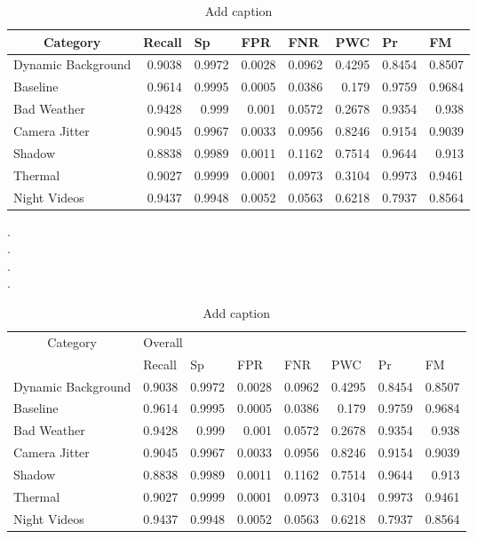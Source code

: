 \documentclass{article}
\begin{document}
\begin{table}[htbp]
  \centering
  \caption{Add caption}
    \begin{tabular}{lrrrrrrr}  \hline
    \multicolumn{1}{c}{Category} & \multicolumn{1}{l}{Recall} & \multicolumn{1}{l}{Sp} & \multicolumn{1}{l}{FPR} & \multicolumn{1}{l}{FNR} & \multicolumn{1}{l}{PWC} & \multicolumn{1}{l}{Pr} & \multicolumn{1}{l}{FM} \\
    \hline
    Dynamic Background & 0.9038 & 0.9972 & 0.0028 & 0.0962 & 0.4295 & 0.8454 & 0.8507 \\
    Baseline & 0.9614 & 0.9995 & 0.0005 & 0.0386 & 0.179 & 0.9759 & 0.9684 \\
    Bad Weather & 0.9428 & 0.999 & 0.001 & 0.0572 & 0.2678 & 0.9354 & 0.938 \\
    Camera Jitter & 0.9045 & 0.9967 & 0.0033 & 0.0956 & 0.8246 & 0.9154 & 0.9039 \\
    Shadow & 0.8838 & 0.9989 & 0.0011 & 0.1162 & 0.7514 & 0.9644 & 0.913 \\
    Thermal & 0.9027 & 0.9999 & 0.0001 & 0.0973 & 0.3104 & 0.9973 & 0.9461 \\
    Night Videos & 0.9437 & 0.9948 & 0.0052 & 0.0563 & 0.6218 & 0.7937 & 0.8564 \\
    \hline  
  \end{tabular}%
  \label{tab:cGan}%
\end{table}%


 .\\
 .\\
. \\
. \\
 

\begin{table}[htbp]
  \centering
  \caption{Add caption}
    \begin{tabular}{lrrrrrrr}
    \toprule
    \multicolumn{1}{c}{Category} & \multicolumn{7}{l}{Overall} \\
\cmidrule{2-8}          & \multicolumn{1}{l}{Recall} & \multicolumn{1}{l}{Sp} & \multicolumn{1}{l}{FPR} & \multicolumn{1}{l}{FNR} & \multicolumn{1}{l}{PWC} & \multicolumn{1}{l}{Pr} & \multicolumn{1}{l}{FM} \\
    \midrule
    Dynamic Background & 0.9038 & 0.9972 & 0.0028 & 0.0962 & 0.4295 & 0.8454 & 0.8507 \\
    Baseline & 0.9614 & 0.9995 & 0.0005 & 0.0386 & 0.179 & 0.9759 & 0.9684 \\
    Bad Weather & 0.9428 & 0.999 & 0.001 & 0.0572 & 0.2678 & 0.9354 & 0.938 \\
    Camera Jitter & 0.9045 & 0.9967 & 0.0033 & 0.0956 & 0.8246 & 0.9154 & 0.9039 \\
    Shadow & 0.8838 & 0.9989 & 0.0011 & 0.1162 & 0.7514 & 0.9644 & 0.913 \\
    Thermal & 0.9027 & 0.9999 & 0.0001 & 0.0973 & 0.3104 & 0.9973 & 0.9461 \\
    Night Videos & 0.9437 & 0.9948 & 0.0052 & 0.0563 & 0.6218 & 0.7937 & 0.8564 \\
    \bottomrule
    \end{tabular}%
  \label{tab:addlabel}%
\end{table}%
\end{document}
